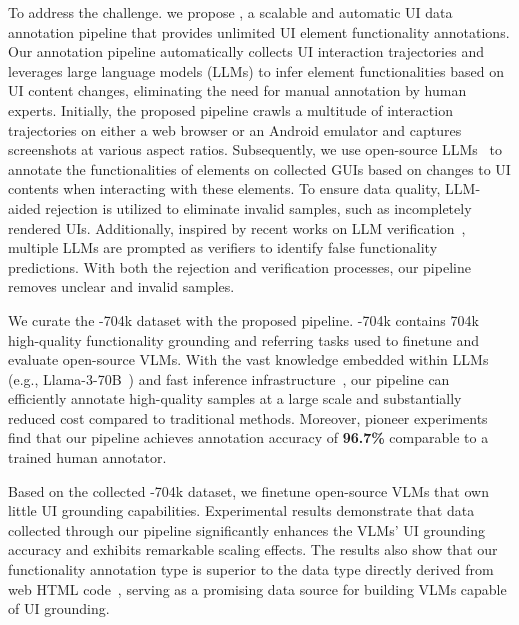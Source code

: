 To address the challenge. we propose \methodname{}, a scalable and automatic UI data annotation pipeline that provides unlimited UI element functionality annotations.
Our annotation pipeline automatically collects UI interaction trajectories and leverages large language models (LLMs) to infer element functionalities based on UI content changes, eliminating the need for manual annotation by human experts.
Initially, the proposed pipeline crawls a multitude of interaction trajectories on either a web browser or an Android emulator and captures screenshots at various aspect ratios. Subsequently, we use open-source LLMs~\citep{llama3modelcard} to annotate the functionalities of elements on collected GUIs based on changes to UI contents when interacting with these elements. To ensure data quality, LLM-aided rejection is utilized to eliminate invalid samples, such as incompletely rendered UIs. Additionally, inspired by recent works on LLM verification~\citep{Weng2022LargeLM,Lightman2023LetsVS}, multiple LLMs are prompted as verifiers to identify false functionality predictions. With both the rejection and verification processes, our pipeline removes unclear and invalid samples.

We curate the \methodname{}-704k dataset with the proposed pipeline. 
\methodname{}-704k contains 704k high-quality functionality grounding and referring tasks used to finetune and evaluate open-source VLMs.
With the vast knowledge embedded within LLMs (e.g., Llama-3-70B~\citep{llama3modelcard}) and fast inference infrastructure~\citep{vllm,accelerate}, our pipeline can efficiently annotate high-quality samples at a large scale and substantially reduced cost compared to traditional methods. Moreover, pioneer experiments find that our pipeline achieves annotation accuracy of \textbf{96.7\%} comparable to a trained human annotator.

Based on the collected \methodname{}-704k dataset, we finetune open-source VLMs that own little UI grounding capabilities. Experimental results demonstrate that data collected through our \methodname{} pipeline significantly enhances the VLMs' UI grounding accuracy and exhibits remarkable scaling effects. The results also show that our functionality annotation type is superior to the data type directly derived from web HTML code~\citep{hong2023cogagent,cheng2024seeclick}, serving as a promising data source for building VLMs capable of UI grounding.